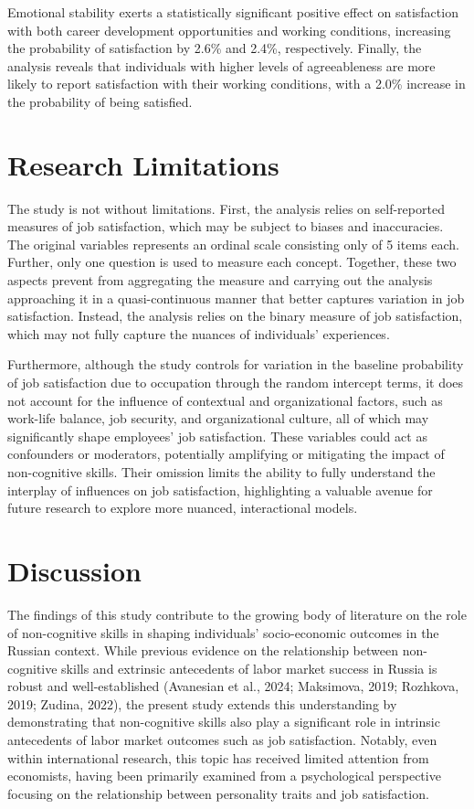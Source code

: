 \documentclass[
]{interact}
\begin{document}
Emotional stability exerts a statistically significant positive effect
on satisfaction with both career development opportunities and working
conditions, increasing the probability of satisfaction by 2.6\% and
2.4\%, respectively. Finally, the analysis reveals that individuals with
higher levels of agreeableness are more likely to report satisfaction
with their working conditions, with a 2.0\% increase in the probability
of being satisfied.

\section{Research Limitations}\label{research-limitations}

The study is not without limitations. First, the analysis relies on
self-reported measures of job satisfaction, which may be subject to
biases and inaccuracies. The original variables represents an ordinal
scale consisting only of 5 items each. Further, only one question is
used to measure each concept. Together, these two aspects prevent from
aggregating the measure and carrying out the analysis approaching it in
a quasi-continuous manner that better captures variation in job
satisfaction. Instead, the analysis relies on the binary measure of job
satisfaction, which may not fully capture the nuances of individuals'
experiences.

Furthermore, although the study controls for variation in the baseline
probability of job satisfaction due to occupation through the random
intercept terms, it does not account for the influence of contextual and
organizational factors, such as work-life balance, job security, and
organizational culture, all of which may significantly shape employees'
job satisfaction. These variables could act as confounders or
moderators, potentially amplifying or mitigating the impact of
non-cognitive skills. Their omission limits the ability to fully
understand the interplay of influences on job satisfaction, highlighting
a valuable avenue for future research to explore more nuanced,
interactional models.

\section{Discussion}\label{discussion}

The findings of this study contribute to the growing body of literature
on the role of non-cognitive skills in shaping individuals'
socio-economic outcomes in the Russian context. While previous evidence
on the relationship between non-cognitive skills and extrinsic
antecedents of labor market success in Russia is robust and
well-established (Avanesian et al., 2024; Maksimova, 2019; Rozhkova,
2019; Zudina, 2022), the present study extends this understanding by
demonstrating that non-cognitive skills also play a significant role in
intrinsic antecedents of labor market outcomes such as job satisfaction.
Notably, even within international research, this topic has received
limited attention from economists, having been primarily examined from a
psychological perspective focusing on the relationship between
personality traits and job satisfaction.
\end{document}
